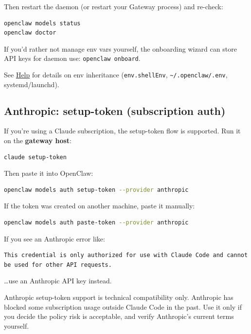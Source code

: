 Then restart the daemon (or restart your Gateway process) and re-check:

\begin{lstlisting}[language=bash]
openclaw models status
openclaw doctor
\end{lstlisting}


If you’d rather not manage env vars yourself, the onboarding wizard can store
API keys for daemon use: \texttt{openclaw onboard}.

See \href{/help}{Help} for details on env inheritance (\texttt{env.shellEnv},
\texttt{\textasciitilde{}/.openclaw/.env}, systemd/launchd).

\subsection{Anthropic: setup-token (subscription auth)}


If you’re using a Claude subscription, the setup-token flow is supported. Run
it on the \textbf{gateway host}:

\begin{lstlisting}[language=bash]
claude setup-token
\end{lstlisting}


Then paste it into OpenClaw:

\begin{lstlisting}[language=bash]
openclaw models auth setup-token --provider anthropic
\end{lstlisting}


If the token was created on another machine, paste it manually:

\begin{lstlisting}[language=bash]
openclaw models auth paste-token --provider anthropic
\end{lstlisting}


If you see an Anthropic error like:

\begin{lstlisting}
This credential is only authorized for use with Claude Code and cannot be used for other API requests.
\end{lstlisting}


…use an Anthropic API key instead.

Anthropic setup-token support is technical compatibility only. Anthropic has blocked
some subscription usage outside Claude Code in the past. Use it only if you decide
the policy risk is acceptable, and verify Anthropic's current terms yourself.


